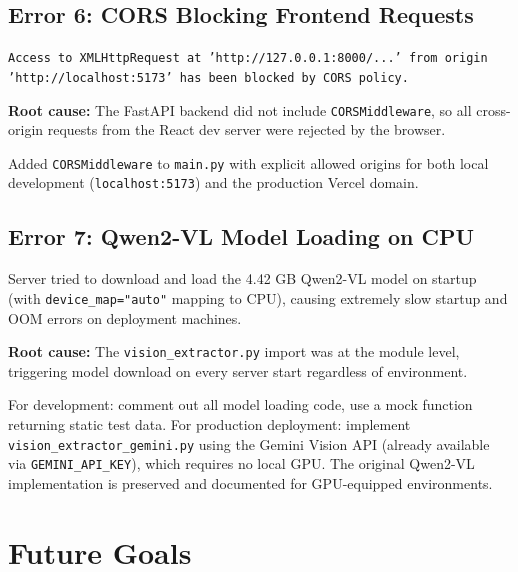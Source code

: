 \documentclass[12pt,a4paper]{article}
\begin{document}
\subsection{Error 6: CORS Blocking Frontend Requests}

\begin{errorbox}[Error]
\texttt{Access to XMLHttpRequest at 'http://127.0.0.1:8000/...' from origin 'http://localhost:5173' has been blocked by CORS policy.}
\end{errorbox}

\textbf{Root cause:} The FastAPI backend did not include \texttt{CORSMiddleware}, so all cross-origin requests from the React dev server were rejected by the browser.

\begin{successbox}[Fix]
Added \texttt{CORSMiddleware} to \texttt{main.py} with explicit allowed origins for both local development (\texttt{localhost:5173}) and the production Vercel domain.
\end{successbox}

\subsection{Error 7: Qwen2-VL Model Loading on CPU}

\begin{errorbox}[Error]
Server tried to download and load the 4.42 GB Qwen2-VL model on startup (with \texttt{device\_map="auto"} mapping to CPU), causing extremely slow startup and OOM errors on deployment machines.
\end{errorbox}

\textbf{Root cause:} The \texttt{vision\_extractor.py} import was at the module level, triggering model download on every server start regardless of environment.

\begin{successbox}[Fix]
For development: comment out all model loading code, use a mock function returning static test data. For production deployment: implement \texttt{vision\_extractor\_gemini.py} using the Gemini Vision API (already available via \texttt{GEMINI\_API\_KEY}), which requires no local GPU. The original Qwen2-VL implementation is preserved and documented for GPU-equipped environments.
\end{successbox}

\section{Future Goals}
\end{document}
